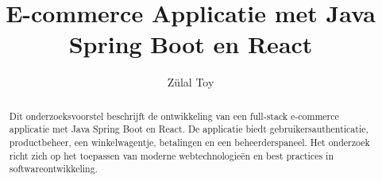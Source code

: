 \documentclass{hogent-article}
\title{E-commerce Applicatie met Java Spring Boot en React}
\author{Zülal Toy}
\begin{document}
\begin{abstract}
  Dit onderzoeksvoorstel beschrijft de ontwikkeling van een full-stack e-commerce applicatie met Java Spring Boot en React. De applicatie biedt gebruikersauthenticatie, productbeheer, een winkelwagentje, betalingen en een beheerderspaneel. Het onderzoek richt zich op het toepassen van moderne webtechnologieën en best practices in softwareontwikkeling. 
\end{abstract}

\tableofcontents



\printbibliography[heading=bibintoc]
\end{document}
